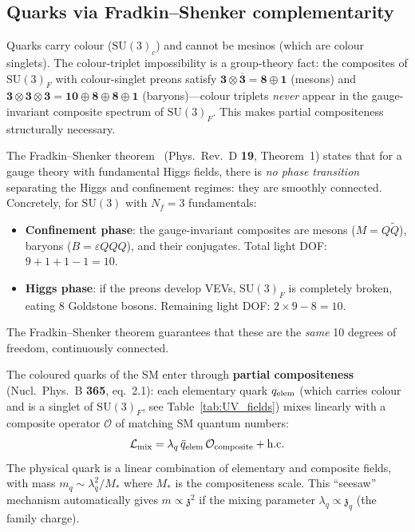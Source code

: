 \documentclass[12pt,a4paper]{article}
\newcommand{\SU}{\mathrm{SU}}
\newcommand{\Nf}{N_{\!f}}
\newcommand{\zch}{\mathfrak{z}}
\begin{document}
\subsection{Quarks via Fradkin--Shenker complementarity}
\label{sec:composites_quarks}

Quarks carry colour ($\SU(3)_c$) and cannot be mesinos (which are
colour singlets).
The colour-triplet impossibility is a group-theory fact:
the composites of $\SU(3)_F$ with colour-singlet preons satisfy
$\mathbf{3}\otimes\overline{\mathbf{3}} = \mathbf{8}\oplus\mathbf{1}$
(mesons) and
$\mathbf{3}\otimes\mathbf{3}\otimes\mathbf{3} =
\mathbf{10}\oplus\mathbf{8}\oplus\mathbf{8}\oplus\mathbf{1}$
(baryons)---colour triplets \emph{never} appear in the
gauge-invariant composite spectrum of $\SU(3)_F$.
This makes partial compositeness structurally necessary.

The Fradkin--Shenker theorem~\cite{FradkinShenker:1979}
(Phys.\ Rev.\ D \textbf{19}, Theorem~1) states that for a
gauge theory with fundamental Higgs fields, there is
\emph{no phase transition} separating the Higgs and confinement
regimes: they are smoothly connected.
Concretely, for $\SU(3)$ with $\Nf = 3$ fundamentals:
\begin{itemize}
  \item \textbf{Confinement phase}: the gauge-invariant
    composites are mesons ($M = Q\tilde{Q}$), baryons
    ($B = \varepsilon QQQ$), and their conjugates.
    Total light DOF: $9 + 1 + 1 - 1 = 10$.
  \item \textbf{Higgs phase}: if the preons develop VEVs,
    $\SU(3)_F$ is completely broken, eating 8 Goldstone bosons.
    Remaining light DOF: $2 \times 9 - 8 = 10$.
\end{itemize}
The Fradkin--Shenker theorem guarantees that these are the
\emph{same} 10 degrees of freedom, continuously connected.

The coloured quarks of the SM enter through \textbf{partial
compositeness}~\cite{Kaplan:1991dc} (Nucl.\ Phys.\ B \textbf{365},
eq.~2.1):
each elementary quark $q_{\rm elem}$ (which carries colour and
is a singlet of $\SU(3)_F$, see Table~\ref{tab:UV_fields})
mixes linearly with a composite operator $\mathcal{O}$ of
matching SM quantum numbers:
\begin{equation}
  \mathcal{L}_{\rm mix} = \lambda_q\,
  \bar{q}_{\rm elem}\,\mathcal{O}_{\rm composite}
  + \text{h.c.}
\end{equation}
The physical quark is a linear combination of elementary and
composite fields, with mass $m_q \sim \lambda_q^2 / M_*$ where
$M_*$ is the compositeness scale.
This ``seesaw'' mechanism automatically gives $m \propto \zch^2$
if the mixing parameter $\lambda_q \propto \zch_q$ (the family
charge).
\end{document}
